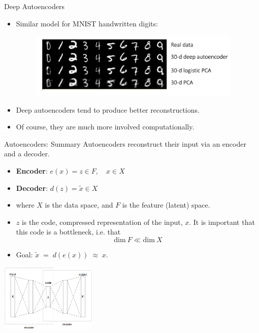 \documentclass[11pt,handout,aspectratio=169]{beamer}
\begin{document}
\begin{frame}{Deep Autoencoders}
  \begin{itemize}
  \item Similar model for MNIST handwritten digits:
    \begin{figure}
      \centering
      \includegraphics[width=3.99in]{pics/auto-enc-mnist.png}
    \end{figure}
  \item Deep autoencoders tend to produce better reconstructions.
  \item Of course, they are much more involved computationally.
  \end{itemize}
\end{frame}


\begin{frame}{Autoencoders: Summary}
  Autoencoders reconstruct their input via an encoder and a decoder.


  \begin{itemize}
  \item \textbf{Encoder}:  $e(x) = z \in F, \quad x \in X$

  \item \textbf{Decoder}:  $d(z) = \tilde x \in X$
  \item where  $X$ is the data space, and  $F$ is the feature (latent) space.
  

\item  $z$ is the code, 
\pause
 compressed representation of the input,  $x$. It is important that this code is a bottleneck, i.e. that
  $$
  \text{dim} \ F \ll \text{dim} \ X
  $$
\item Goal:
  $  \tilde x \;=\; d(e(x)) \;\approx\; x$.
\end{itemize}
\vspace{-9mm}\hspace{8mm}\qquad\qquad\qquad\qquad\qquad\qquad\qquad    \includegraphics[width=1.8in]{pics/lecture_10_1.png}
\end{frame}
\end{document}
